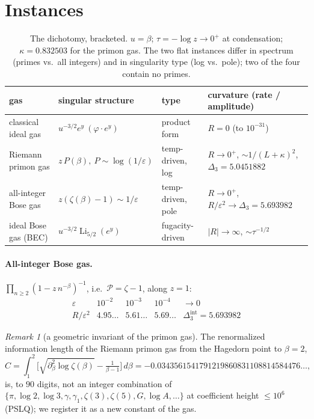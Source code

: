 \documentclass[a4paper,11pt]{article}
\theoremstyle{plain}
\theoremstyle{definition}
\theoremstyle{remark}
\newtheorem{remark}{Remark}
\newcommand{\Ric}{R}                 %
\newcommand{\Li}{\operatorname{Li}}
\newcommand{\eps}{\varepsilon}
\begin{document}
\section{Instances}\label{sec:instances}

\begin{table}[h]
\centering
\begin{tabular}{@{}llll@{}}
\toprule
gas & singular structure & type & curvature (rate / amplitude)\\
\midrule
classical ideal gas        & $u^{-3/2}e^{y}\ (\varphi\cdot e^{y})$ & product form     & $\Ric=0$ (to $10^{-31}$)\\
Riemann primon gas         & $z\,P(\beta),\ P\sim\log(1/\eps)$    & temp-driven, log & $\Ric\to0^{+}$, $\sim1/(L+\kappa)^2$, $\Delta_3=5.0451882$\\
all-integer Bose gas       & $z(\zeta(\beta)-1)\sim1/\eps$        & temp-driven, pole& $\Ric\to0^{+}$, $\Ric/\eps^2\to\Delta_3=5.693982$\\
ideal Bose gas (BEC)       & $u^{-3/2}\Li_{5/2}(e^{y})$           & fugacity-driven  & $|\Ric|\to\infty$, $\sim\tau^{-1/2}$\\
\bottomrule
\end{tabular}
\caption{The dichotomy, bracketed. $u=\beta$; $\tau=-\log z\to0^{+}$ at condensation;
$\kappa=0.832503$ for the primon gas. The two flat instances differ in spectrum (primes vs.\
all integers) and in singularity type (log vs.\ pole); two of the four contain no primes.}
\label{tab:instances}
\end{table}

\paragraph{All-integer Bose gas.} $\prod_{n\ge2}(1-z\,n^{-\beta})^{-1}$, i.e.\ $\mathcal P=\zeta-1$,
along $z=1$:
\[
\begin{array}{r|cccc}
\eps      & 10^{-2}      & 10^{-3}      & 10^{-4}      & \to0\\\hline
\Ric/\eps^2 & 4.95\!\dots & 5.61\!\dots & 5.69\!\dots & \Delta_3^{\mathrm{int}}=5.693982
\end{array}
\]

\begin{remark}[a geometric invariant of the primon gas]\label{rem:Cconst}
The renormalized information length of the Riemann primon gas from the Hagedorn point to
$\beta=2$,
\[
   C=\int_{1}^{2}\!\Big[\sqrt{\partial_\beta^2\log\zeta(\beta)}-\tfrac{1}{\beta-1}\Big]\,d\beta
    =-0.0343561541791219860831108814584476\ldots,
\]
is, to $90$ digits, not an integer combination of $\{\pi,\log2,\log3,\gamma,\gamma_1,\zeta(3),
\zeta(5),G,\log A,\dots\}$ at coefficient height $\le10^{6}$ (PSLQ); we register it as a new
constant of the gas. %
\end{remark}
\end{document}
